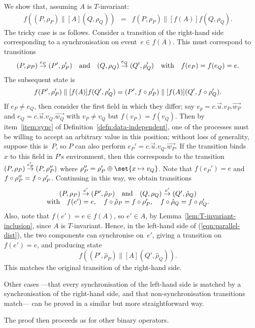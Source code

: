 We show that, assuming $A$ is $T$-invariant:
%
\begin{eqnarray}
\label{eqn:parallel-dist}
f((P,\rho_P) \parallel[A] (Q,\rho_Q)) & = & 
  f(P,\rho_P) \parallel[f(A)] f(Q,\rho_Q).
\end{eqnarray}
%
The tricky case is as follows.  Consider a transition of the right-hand side
corresponding to a synchronisation on event~$e \in f(A)$.  This must
correspond to transitions 
\[
(P,\rho_P) \stackrel{e_P}{\rightarrow} (P',\rho_P') \quad\mbox{and}\quad
(Q,\rho_Q) \stackrel{e_Q}{\rightarrow} (Q',\rho_Q') \quad
\mbox{with}\quad f(e_P) = f(e_Q) = e.
\]
The subsequent state is 
\[
f(P',\rho_P') \parallel[f(A)] f(Q',\rho_Q') = 
  (P',f\circ\rho_P') \parallel[f(A)] (Q',f\circ\rho_Q').
\]
If $e_P \ne e_Q$, then consider the first field in which they differ; say $e_p
= c.\vec{u}.v_P.\vec{w_P}$ and $e_Q = c.\vec{u}.v_Q.\vec{w_Q}$ with $v_P \ne
v_Q$ but $f(v_P) = f(v_Q)$.
%
Then by item~\ref{item:sync} of Definition~\ref{defn:data-independent}, one of
the processes must be willing to accept an arbitrary value in this position;
without loss of generality, suppose this is~$P$, so $P$ can also perform $e_P'
= c.\vec{u}.v_Q.\vec{w_P}$.  If the transition binds $x$ to this field in
$P$'s environment, then this corresponds to the transition
$(P,\rho_P) \stackrel{e_P'}{\rightarrow} (P,\rho_P'')$ where $\rho_P''
= \rho_P' \oplus \set{x \mapsto v_Q}$.  Note that $f(e_P') = e$ and
$f\circ\rho_P'' = f \circ \rho_P'$.
%
Continuing in this way, we obtain transitions
\[
\begin{array}{c}
(P,\rho_P) \stackrel{e'}{\rightarrow} (P',\hat\rho_P) \quad\mbox{and}\quad
(Q,\rho_Q) \stackrel{e'}{\rightarrow} (Q',\hat\rho_Q) \\
\mbox{with}\quad f(e')  = e, \quad 
f \circ \hat\rho_P = f \circ \rho_P', \quad
f \circ \hat\rho_Q = f \circ \rho_Q'.
\end{array}
\]
Also, note that $f(e') = e \in f(A)$, so $e' \in A$, by
Lemma~\ref{lem:T-invariant-inclusion}, since $A$ is $T$-invariant.
%
Hence, in the left-hand side of (\ref{eqn:parallel-dist}), the two
components can synchronise on~$e'$, giving a transition on $f(e') = e$, and
producing state 
\[
f( (P',\hat\rho_P) \parallel[A] (Q',\hat\rho_Q) ) .
\]
This matches the original transition of the right-hand side.

Other cases ---that every synchronisation of the left-hand side is matched by
a synchronisation of the right-hand side, and that non-synchronisation
transitions match--- can be proved in a similar but more straightforward way.

The proof then proceeds as for other binary operators.  

